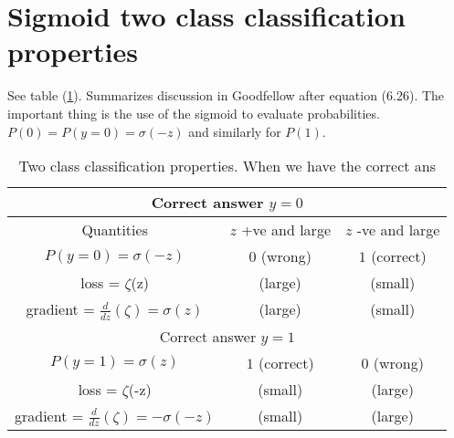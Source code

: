 \documentclass{article}
\newcommand{\dd}[2]{\frac{d}{d{#2}}{(#1)} }
\newcommand{\ra}[1]{\renewcommand{\arraystretch}{#1}}
\begin{document}
\section{Sigmoid two class classification properties}
See table (\ref{tab:sigmoid}). Summarizes discussion in Goodfellow after equation (6.26). The important thing is the use of the sigmoid to evaluate probabilities. $P(0)=P(y=0)=\sigma(-z)$ and similarly for $P(1)$.
\begin{table}\centering
  \ra{1.3}
  \begin{tabular}{ccc}
    \toprule
    \multicolumn{3}{c}{Correct answer $y=0$}\\
    \midrule
    {Quantities} &  {$z$ +ve and large }  & {$z$ -ve and large}\\
    \midrule
    $P(y=0)=\sigma(-z)$  &  $0$ (wrong)  &  $1$ (correct)\\
    loss = $\zeta$(z)    &  (large)      &  (small)\\
    gradient = $\dd{\zeta}{z}=\sigma(z)$ & (large)  & (small)\\
    \toprule
    \multicolumn{3}{c}{Correct answer $y=1$}\\
    \midrule
    $P(y=1)=\sigma(z)$  &  $1$ (correct)  &  $0$ (wrong)\\
    loss = $\zeta$(-z)    &  (small)      &  (large)\\
    gradient = $\dd{\zeta}{z}=-\sigma(-z)$ & (small)  & (large)\\
    \midrule
  \end{tabular}
\caption{\label{tab:sigmoid} Two class classification properties. When we have the correct ans}  
\end{table}  
\end{document}
